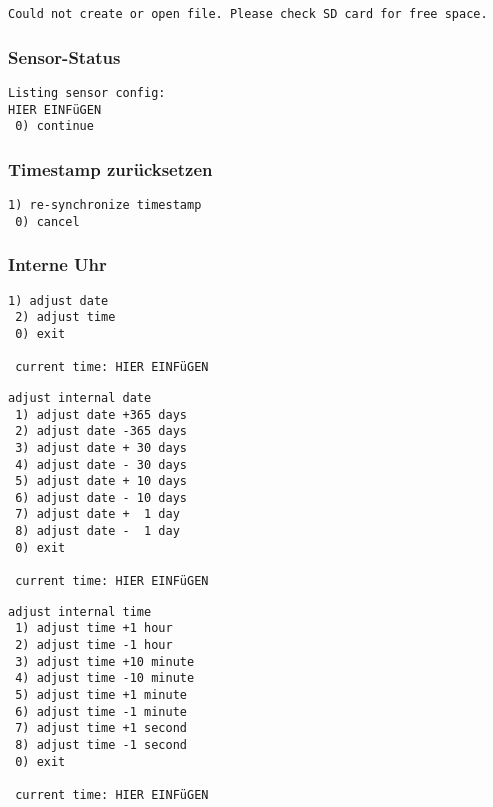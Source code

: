 \begin{lstlisting}[caption=Fehlermeldung beim Starten eines Sensors, label=list.sensorerror]
Could not create or open file. Please check SD card for free space.
\end{lstlisting}

\subsubsection{Sensor-Status}
\begin{lstlisting}[caption=Untermenü Sensor-Status, label=list.sensorstatus]
Listing sensor config:
HIER EINFüGEN
 0) continue
\end{lstlisting}


\subsubsection{Timestamp zurücksetzen}
\begin{lstlisting}[caption=Untermenü Timestamp zurücksetzen, label=list.timestamp]
 1) re-synchronize timestamp
 0) cancel
\end{lstlisting}


\subsubsection{Interne Uhr}
\begin{lstlisting}[caption=Untermenü interne Uhr, label=list.intclock]
 1) adjust date
 2) adjust time
 0) exit

 current time: HIER EINFüGEN
\end{lstlisting}

\begin{lstlisting}[caption=Untermenü Datum einstellen, label=list.setdate]
adjust internal date
 1) adjust date +365 days
 2) adjust date -365 days
 3) adjust date + 30 days
 4) adjust date - 30 days
 5) adjust date + 10 days
 6) adjust date - 10 days
 7) adjust date +  1 day
 8) adjust date -  1 day
 0) exit

 current time: HIER EINFüGEN
\end{lstlisting}

\begin{lstlisting}[caption=Untermenü Uhrzeit einstellen, label=list.settime]
adjust internal time
 1) adjust time +1 hour
 2) adjust time -1 hour
 3) adjust time +10 minute
 4) adjust time -10 minute
 5) adjust time +1 minute
 6) adjust time -1 minute
 7) adjust time +1 second
 8) adjust time -1 second
 0) exit

 current time: HIER EINFüGEN
\end{lstlisting}

